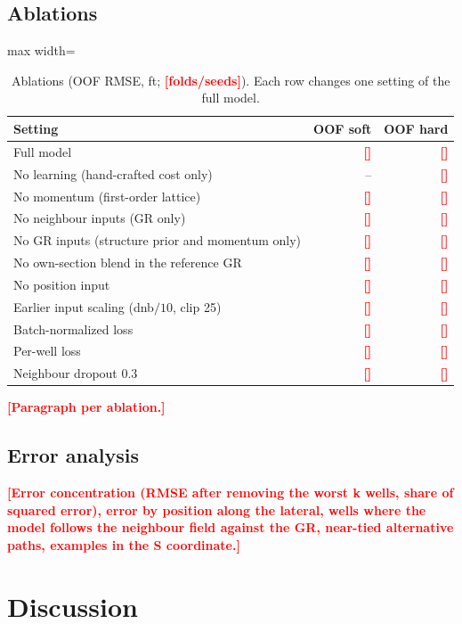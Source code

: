\documentclass[preprint,12pt,authoryear]{elsarticle}
\newcommand{\PH}[1]{\textcolor{red}{\textbf{[#1]}}}
\begin{document}
\subsection{Ablations}
\begin{table}[!htbp]\centering\small
\caption{Ablations (OOF RMSE, ft; \PH{folds/seeds}). Each row changes one setting of the full model.}\label{tab:ablation}
\begin{adjustbox}{max width=\linewidth}
\begin{tabular}{lrr}
\toprule
Setting & OOF soft & OOF hard \\
\midrule
Full model & \PH{} & \PH{} \\
No learning (hand-crafted cost only) & -- & \PH{} \\
No momentum (first-order lattice) & \PH{} & \PH{} \\
No neighbour inputs (GR only) & \PH{} & \PH{} \\
No GR inputs (structure prior and momentum only) & \PH{} & \PH{} \\
No own-section blend in the reference GR & \PH{} & \PH{} \\
No position input & \PH{} & \PH{} \\
Earlier input scaling (dnb$/10$, clip 25) & \PH{} & \PH{} \\
Batch-normalized loss & \PH{} & \PH{} \\
Per-well loss & \PH{} & \PH{} \\
Neighbour dropout 0.3 & \PH{} & \PH{} \\
\bottomrule
\end{tabular}
\end{adjustbox}
\end{table}

\PH{Paragraph per ablation.}

\subsection{Error analysis}
\PH{Error concentration (RMSE after removing the worst k wells, share of squared error), error by position along the lateral, wells where the model follows the neighbour field against the GR, near-tied alternative paths, examples in the S coordinate.}

\section{Discussion}\label{sec:discussion}
\end{document}
